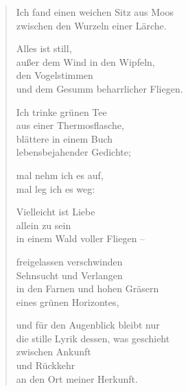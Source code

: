 
\cleartoverso


\begin{verse}
Ich fand einen weichen Sitz aus Moos\\
zwischen den Wurzeln einer Lärche.

Alles ist still,\\
außer dem Wind in den Wipfeln,\\
den Vogelstimmen\\
und dem Gesumm beharrlicher Fliegen.

Ich trinke grünen Tee\\
aus einer Thermosflasche,\\
blättere in einem Buch\\
lebensbejahender Gedichte;

mal nehm ich es auf,\\
mal leg ich es weg:

Vielleicht ist Liebe\\
allein zu sein\\
in einem Wald voller Fliegen --

freigelassen verschwinden\\
Sehnsucht und Verlangen\\
in den Farnen und hohen Gräsern\\
eines grünen Horizontes,

\clearpage

und für den Augenblick bleibt nur\\
die stille Lyrik dessen, was geschieht\\
zwischen Ankunft\\
und Rückkehr\\
an den Ort meiner Herkunft.

\end{verse}

\clearpage


